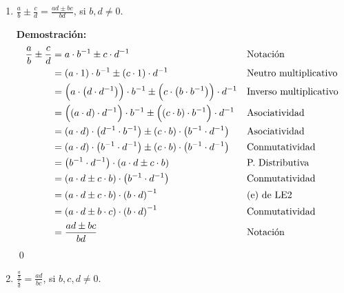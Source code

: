 \documentclass[11pt]{article}
\begin{document}
\begin{enumerate}[label=\alph*)]
    \item $\frac{a}{b} \pm \frac{c}{d} = \frac{ad \pm bc}{bd} $, si $b, d \neq 0$.
    
    \textbf{Demostración:}\begin{align*}
    \frac{a}{b} \pm \frac{c}{d}  &=	a \cdot b^{-1} \pm c \cdot d^{-1} && \text{Notación}\\
    &=	\left( a \cdot 1 \right)   \cdot b^{-1} \pm \left( c \cdot 1 \right) \cdot d^{-1} && \text{Neutro multiplicativo}\\
    &=	\Bigl( a \cdot  \left( d \cdot d^{-1} \right) \Bigr) \cdot b^{-1} \pm \Bigl( c \cdot  \left( b \cdot b^{-1}  \right)  \Bigr)  \cdot d^{-1} && \text{Inverso multiplicativo}\\
    &=	\Bigl(  \left( a \cdot d \right) \cdot d^{-1} \Bigr) \cdot b^{-1} \pm \Bigl(  \left( c \cdot b \right) \cdot b^{-1} \Bigr) \cdot d^{-1} && \text{Asociatividad}\\
    &=	\left( a \cdot d \right)  \cdot  \left( d^{-1} \cdot b^{-1}  \right) \pm \left( c \cdot b \right)  \cdot  \left( b^{-1} \cdot d^{-1}  \right) && \text{Asociatividad}\\
    &=	\left( a \cdot d \right)  \cdot  \left( b^{-1} \cdot d^{-1}  \right) \pm \left( c \cdot b \right)  \cdot  \left( b^{-1} \cdot d^{-1}  \right) && \text{Conmutatividad}\\
    &=	\left( b^{-1} \cdot d^{-1}  \right) \cdot \left( a \cdot d \pm c \cdot b \right) && \text{P. Distributiva}\\
    &=	\left( a \cdot d \pm c \cdot b \right) \cdot  \left( b^{-1} \cdot d^{-1} \right) && \text{Conmutatividad}\\
    &=	\left( a \cdot d \pm c \cdot b \right) \cdot  \left( b \cdot d \right)^{-1} && \text{(e) de LE2}\\
    &=	\left( a \cdot d \pm b \cdot c \right) \cdot \left( b \cdot d \right)^{-1} && \text{Conmutatividad}\\
    &=	\frac{ad \pm bc}{bd} && \text{Notación}
    \end{align*}\qed

    \item $\frac{\frac{a}{b}}{\frac{c}{d}} = \frac{ad}{bc}$, si $b, c, d \neq 0$.
    

\end{enumerate}
\end{document}
